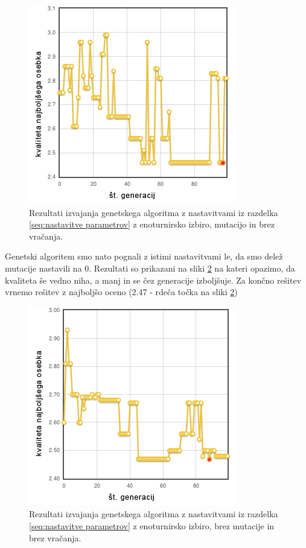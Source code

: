 \documentclass[a4paper, 12pt]{book}
\begin{document}
\begin{figure}
\centering
\includegraphics[scale=0.70]{enotur_mut_brez_vrac.png}
\caption{Rezultati izvajanja genetskega algoritma z nastavitvami iz razdelka \ref{seq:nastavitve parametrov} z enoturnirsko izbiro, mutacijo in brez vra\v canja.}
\label{fig1}
\end{figure}

Genetski algoritem smo nato pognali z istimi nastavitvami le, da smo dele\v z mutacije nastavili na 0.
Rezultati so prikazani na sliki \ref{fig2} na kateri opazimo, da kvaliteta \v se vedno niha, a manj in se \v cez generacije izbolj\v suje. Za kon\v cno re\v sitev vrnemo re\v sitev z najbolj\v so oceno (2.47 - rde\v ca to\v cka na sliki \ref{fig2})

\begin{figure}
\centering
\includegraphics[scale=0.70]{enotur_brez_mut_brez_vrac.png}
\caption{Rezultati izvajanja genetskega algoritma z nastavitvami iz razdelka \ref{seq:nastavitve parametrov} z enoturnirsko izbiro, brez mutacije in brez vra\v canja.}
\label{fig2}
\end{figure}
\end{document}
